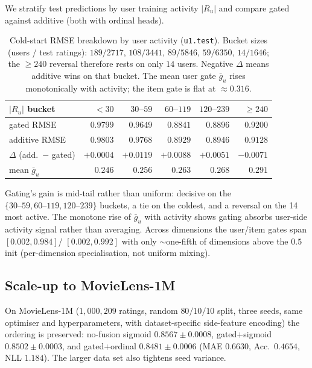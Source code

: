 \documentclass[a4paper]{article} %
\begin{document}
We stratify test predictions by user training activity $|R_u|$ and compare
gated against additive (both with ordinal heads).

\begin{table}[ht]
\centering
\caption{Cold-start RMSE breakdown by user activity (\texttt{u1.test}). Bucket
sizes (users / test ratings): $189/2717$, $108/3441$, $89/5846$, $59/6350$,
$14/1646$; the $\ge\!240$ reversal therefore rests on only $14$ users.
Negative $\Delta$ means additive wins on that bucket. The mean user gate
$\bar g_u$ rises monotonically with activity; the item gate is flat at
$\approx 0.316$.}
\label{tab:coldstart}
\begin{tabular}{lrrrrr}
\toprule
$|R_u|$ bucket & $<\!30$ & $30$--$59$ & $60$--$119$ & $120$--$239$ & $\ge\!240$ \\
\midrule
gated RMSE                & $0.9799$ & $0.9649$ & $0.8841$ & $0.8896$ & $0.9200$ \\
additive RMSE             & $0.9803$ & $0.9768$ & $0.8929$ & $0.8946$ & $0.9128$ \\
$\Delta$ (add.\ $-$ gated) & $+0.0004$ & $+0.0119$ & $+0.0088$ & $+0.0051$ & $-0.0071$ \\
mean $\bar g_u$           & $0.246$ & $0.256$ & $0.263$ & $0.268$ & $0.291$ \\
\bottomrule
\end{tabular}
\end{table}

Gating's gain is mid-tail rather than uniform: decisive on the
$\{30\text{--}59,60\text{--}119,120\text{--}239\}$ buckets, a tie on the
coldest, and a reversal on the 14 most active. The monotone rise of $\bar g_u$
with activity shows gating absorbs user-side activity signal rather than
averaging. Across dimensions the user/item gates span $[0.002,0.984]$/
$[0.002,0.992]$ with only $\sim$one-fifth of dimensions above the $0.5$ init
(per-dimension specialisation, not uniform mixing).

\subsection{Scale-up to MovieLens-1M}
\label{sec:ml1m}
On MovieLens-1M ($1{,}000{,}209$ ratings, random $80/10/10$ split, three seeds,
same optimiser and hyperparameters, with dataset-specific side-feature
encoding) the ordering is preserved: no-fusion sigmoid
$0.8567\pm0.0008$, gated$+$sigmoid $0.8502\pm0.0003$, and
gated$+$ordinal $\mathbf{0.8481\pm0.0006}$ (MAE $0.6630$, Acc.\ $0.4654$,
NLL $1.184$). The larger data set also tightens seed variance.
\end{document}
